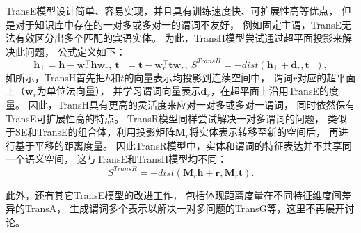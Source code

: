 TransE模型设计简单、容易实现，并且具有训练速度快、可扩展性高等优点，
但是对于知识库中存在的一对多或多对一的谓词不友好，
例如固定主谓，TransE无法有效区分出多个匹配的宾语实体。
为此，TransH模型\cite{wang2014knowledge}尝试通过超平面投影来解决此问题，
公式定义如下：
\begin{equation}
  \bm{h}_\bot = \bm{h} - \bm{w}_r^\top \bm{h} \bm{w}_r, \ 
  \bm{t}_\bot = \bm{t} - \bm{w}_r^\top \bm{t} \bm{w}_r, \
  S^{TransH} = -dist(\bm{h}_\bot + \bm{d}_r, \bm{t}_\bot),
\end{equation}
\noindent
如所示，TransH首先把$h$和$t$的向量表示均投影到连续空间中，
谓词$r$对应的超平面上（$\bm{w}_r$为单位法向量），
并学习谓词向量表示$\bm{d}_r$，在超平面上沿用TransE的度量。
因此，TransH具有更高的灵活度来应对一对多或多对一谓词，
同时依然保有TransE可扩展性高的特点。
TransR模型\cite{lin2015learning}同样尝试解决一对多谓词的问题，
类似于SE和TransE的组合体，利用投影矩阵$\bm{M}_r$将实体表示转移至新的空间后，
再进行基于平移的距离度量。
因此TransR模型中，实体和谓词的特征表达并不共享同一个语义空间，
这与TransE和TransH模型均不同：
\begin{equation}
S^{TransR} = -dist(\bm{M}_r \bm{h} + \bm{r}, \bm{M}_r \bm{t}).
\end{equation}

此外，还有其它TransE模型的改进工作，
包括体现距离度量在不同特征维度间差异的TransA\cite{xiao2015transa}，
生成谓词多个表示以解决一对多问题的TransG\cite{xiao2016transg}等，这里不再展开讨论。

